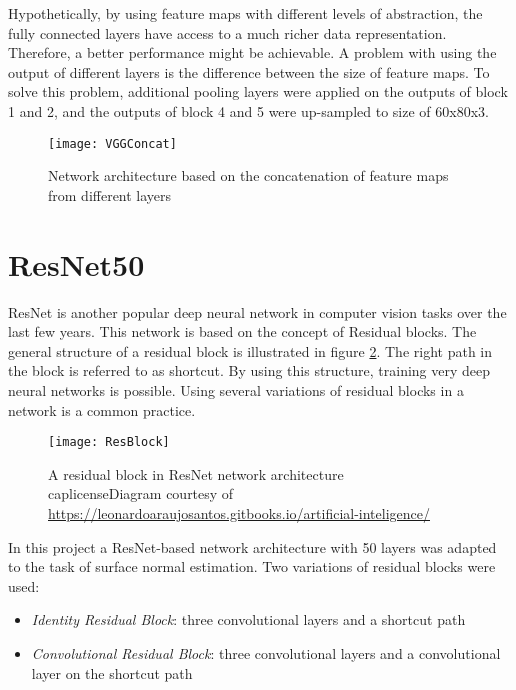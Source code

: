 Hypothetically, by using feature maps with different levels of abstraction, the fully connected layers have access to a much richer data representation. Therefore, a better performance might be achievable. A problem with using the output of different layers is the difference between the size of feature maps. To solve this problem, additional pooling layers were applied on the outputs of block 1 and 2, and the outputs of block 4 and 5 were up-sampled to size of 60x80x3. 

\begin{figure}
    \centering
    \texttt{[image: VGGConcat]}
    \caption{Network architecture based on the concatenation of feature maps from different layers}
    \label{fig:vggconcat}
\end{figure}

\section{ResNet50}

ResNet \cite{resnet} is another popular deep neural network in computer vision tasks over the last few years. This network is based on the concept of Residual blocks. The general structure of a residual block is illustrated in figure \ref{fig:resblock}. The right path in the block is referred to as shortcut. By using this structure, training very deep neural networks is possible. Using several variations of residual blocks in a network is a common practice. 

\begin{figure}[h]
    \centering
    \texttt{[image: ResBlock]}
    \caption{A residual block in ResNet network architecture \\caplicense{Diagram courtesy of \url{https://leonardoaraujosantos.gitbooks.io/artificial-inteligence/}}}
    \label{fig:resblock}
\end{figure}

In this project a ResNet-based network architecture with 50 layers was adapted to the task of surface normal estimation. Two variations of residual blocks were used: 

\begin{itemize}
    \item \emph{Identity Residual Block}: three convolutional layers and a shortcut path
    \item \emph{Convolutional Residual Block}: three convolutional layers and a convolutional layer on the shortcut path
\end{itemize}

